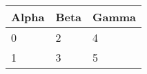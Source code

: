 \documentclass{report}
\begin{document}
\noindent\begin{tabularx}{\textwidth}{|X|X|X|}
\hline
Alpha & Beta & Gamma \\ \hline
0     & 2    & 4     \\ \hline
1     & 3    & 5     \\ \hline
\end{tabularx}
\end{document}
